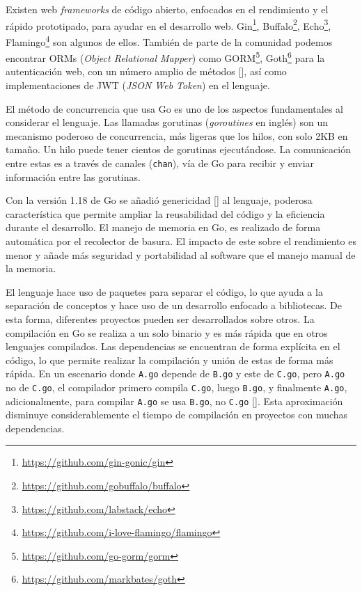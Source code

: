 Existen web \textit{frameworks} de código abierto, enfocados en el rendimiento y el rápido prototipado, para ayudar en el desarrollo web. Gin\footnote{\url{https://github.com/gin-gonic/gin}}, Buffalo\footnote{\url{https://github.com/gobuffalo/buffalo}}, Echo\footnote{\url{https://github.com/labstack/echo}}, Flamingo\footnote{\url{https://github.com/i-love-flamingo/flamingo}} son algunos de ellos. También de parte de la comunidad podemos encontrar ORMs (\textit{Object Relational Mapper}) como GORM\footnote{\url{https://github.com/go-gorm/gorm}}, Goth\footnote{\url{https://github.com/markbates/goth}} para la autenticación web, con un número amplio de métodos [\cite{goth}], así como implementaciones de JWT (\textit{JSON Web Token}) en el lenguaje.

El método de concurrencia que usa Go es uno de los aspectos fundamentales al considerar el lenguaje. Las llamadas gorutinas (\textit{goroutines} en inglés) son un mecanismo poderoso de concurrencia, más ligeras que los hilos, con solo 2KB en tamaño. Un hilo puede tener cientos de gorutinas ejecutándose. La comunicación entre estas es a través de canales (\verb+chan+), vía de Go para recibir y enviar información entre las gorutinas.

Con la versión 1.18 de Go se añadió genericidad [\cite{go-generics}] al lenguaje, poderosa característica que permite ampliar la reusabilidad del código y la eficiencia durante el desarrollo. El manejo de memoria en Go, es realizado de forma automática por el recolector de basura. El impacto de este sobre el rendimiento es menor y añade más seguridad y portabilidad al software que el manejo manual de la memoria.

El lenguaje hace uso de paquetes para separar el código, lo que ayuda a la separación de conceptos y hace uso de un desarrollo enfocado a bibliotecas. De esta forma, diferentes proyectos pueden ser desarrollados sobre otros. La compilación en Go se realiza a un solo binario y es más rápida que en otros lenguajes compilados. Las dependencias se encuentran de forma explícita en el código, lo que permite realizar la compilación y unión de estas de forma más rápida. En un escenario donde \verb+A.go+ depende de \verb+B.go+ y este de \verb+C.go+, pero \verb+A.go+ no de \verb+C.go+, el compilador primero compila \verb+C.go+, luego \verb+B.go+, y finalmente \verb+A.go+, adicionalmente, para compilar \verb+A.go+ se usa \verb+B.go+, no \verb+C.go+ [\cite{go-deps}]. Esta aproximación disminuye considerablemente el tiempo de compilación en proyectos con muchas dependencias.

